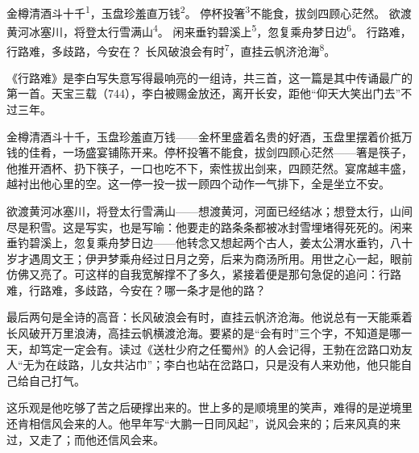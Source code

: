 
\begin{poem}
金樽清酒斗十千\textsuperscript{1}，玉盘珍羞直万钱\textsuperscript{2}。
停杯投箸\textsuperscript{3}不能食，拔剑四顾心茫然。
欲渡黄河冰塞川，将登太行雪满山\textsuperscript{4}。
闲来垂钓碧溪上\textsuperscript{5}，忽复乘舟梦日边\textsuperscript{6}。
行路难，行路难，多歧路，今安在？
长风破浪会有时\textsuperscript{7}，直挂云帆济沧海\textsuperscript{8}。
\end{poem}

\begin{annotations}
\end{annotations}

\begin{appreciation}
《行路难》是李白写失意写得最响亮的一组诗，共三首，这一篇是其中传诵最广的第一首。天宝三载（744），李白被赐金放还，离开长安，距他“仰天大笑出门去”不过三年。

金樽清酒斗十千，玉盘珍羞直万钱——金杯里盛着名贵的好酒，玉盘里摆着价抵万钱的佳肴，一场盛宴铺陈开来。停杯投箸不能食，拔剑四顾心茫然——箸是筷子，他推开酒杯、扔下筷子，一口也吃不下，索性拔出剑来，四顾茫然。宴席越丰盛，越衬出他心里的空。这一停一投一拔一顾四个动作一气排下，全是坐立不安。

欲渡黄河冰塞川，将登太行雪满山——想渡黄河，河面已经结冰；想登太行，山间尽是积雪。这是写实，也是写喻：他要走的路条条都被冰封雪埋堵得死死的。闲来垂钓碧溪上，忽复乘舟梦日边——他转念又想起两个古人，姜太公渭水垂钓，八十岁才遇周文王；伊尹梦乘舟经过日月之旁，后来为商汤所用。用世之心一起，眼前仿佛又亮了。可这样的自我宽解撑不了多久，紧接着便是那句急促的追问：行路难，行路难，多歧路，今安在？哪一条才是他的路？

最后两句是全诗的高音：长风破浪会有时，直挂云帆济沧海。他说总有一天能乘着长风破开万里浪涛，高挂云帆横渡沧海。要紧的是“会有时”三个字，不知道是哪一天，却笃定一定会有。读过《送杜少府之任蜀州》的人会记得，王勃在岔路口劝友人“无为在歧路，儿女共沾巾”；李白也站在岔路口，只是没有人来劝他，他只能自己给自己打气。

这乐观是他吃够了苦之后硬撑出来的。世上多的是顺境里的笑声，难得的是逆境里还肯相信风会来的人。他早年写“大鹏一日同风起”，说风会来的；后来风真的来过，又走了；而他还信风会来。
\end{appreciation}
